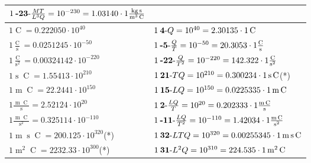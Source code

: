 \begin{center}
\begin{longtable}{l l}
	{\color{black}$1\:\text{\textbf{-23}-} \frac{MT}{L^3Q}=10^{-230} = 1.03140 \cdot 1 \bm{\mathrm{ }}\frac{\operatorname{kg}\operatorname{s}}{\operatorname{m}^3\operatorname{C}}$}\\
\hline{\color{black}$1 \bm{\mathrm{ }}\operatorname{C} = 0.222050\cdot10^{40} $}&
	{\color{black}$1\:\text{\textbf{4}-} Q=10^{40} = 2.30135 \cdot 1 \bm{\mathrm{ }}\operatorname{C}$}\\
{\color{black}$1 \bm{\mathrm{ }}\frac{\operatorname{C}}{\operatorname{s}} = 0.0251245\cdot10^{-50} $}&
	{\color{black}$1\:\text{\textbf{-5}-} \frac{Q}{T}=10^{-50} = 20.3053 \cdot 1 \bm{\mathrm{ }}\frac{\operatorname{C}}{\operatorname{s}}$}\\
{\color{black}$1 \bm{\mathrm{ }}\frac{\operatorname{C}}{\operatorname{s}^2} = 0.00324142\cdot10^{-220} $}&
	{\color{black}$1\:\text{\textbf{-22}-} \frac{Q}{T^2}=10^{-220} = 142.322 \cdot 1 \bm{\mathrm{ }}\frac{\operatorname{C}}{\operatorname{s}^2}$}\\
{\color{black}$1 \bm{\mathrm{ }}\operatorname{s}\operatorname{C} = 1.55413\cdot10^{210} $}&
	{\color{black}$1\:\text{\textbf{21}-} TQ=10^{210} = 0.300234 \cdot 1 \bm{\mathrm{ }}\operatorname{s}\operatorname{C}$}\quad(*)\\
{\color{black}$1 \bm{\mathrm{ }}\operatorname{m}\operatorname{C} = 22.2441\cdot10^{150} $}&
	{\color{black}$1\:\text{\textbf{15}-} LQ=10^{150} = 0.0225335 \cdot 1 \bm{\mathrm{ }}\operatorname{m}\operatorname{C}$}\\
{\color{black}$1 \bm{\mathrm{ }}\frac{\operatorname{m}\operatorname{C}}{\operatorname{s}} = 2.52124\cdot10^{20} $}&
	{\color{black}$1\:\text{\textbf{2}-} \frac{LQ}{T}=10^{20} = 0.202333 \cdot 1 \bm{\mathrm{ }}\frac{\operatorname{m}\operatorname{C}}{\operatorname{s}}$}\\
{\color{black}$1 \bm{\mathrm{ }}\frac{\operatorname{m}\operatorname{C}}{\operatorname{s}^2} = 0.325114\cdot10^{-110} $}&
	{\color{black}$1\:\text{\textbf{-11}-} \frac{LQ}{T^2}=10^{-110} = 1.42034 \cdot 1 \bm{\mathrm{ }}\frac{\operatorname{m}\operatorname{C}}{\operatorname{s}^2}$}\\
{\color{black}$1 \bm{\mathrm{ }}\operatorname{m}\operatorname{s}\operatorname{C} = 200.125\cdot10^{320} $}\quad(*)&
	{\color{black}$1\:\text{\textbf{32}-} LTQ=10^{320} = 0.00255345 \cdot 1 \bm{\mathrm{ }}\operatorname{m}\operatorname{s}\operatorname{C}$}\\
{\color{black}$1 \bm{\mathrm{ }}\operatorname{m}^2\operatorname{C} = 2232.33\cdot10^{300} $}\quad(*)&
	{\color{black}$1\:\text{\textbf{31}-} L^2Q=10^{310} = 224.535 \cdot 1 \bm{\mathrm{ }}\operatorname{m}^2\operatorname{C}$}\\

\end{longtable}
\end{center}
